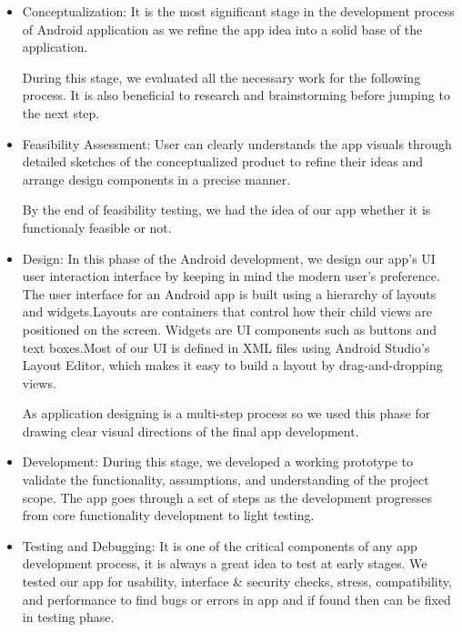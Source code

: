 \begin{itemize}

\item Conceptualization: It is the most significant stage in the development process of Android application as we refine the app idea into a solid base of the application. \par
During this stage, we evaluated all the necessary work for the following process. It is also beneficial to research and brainstorming before jumping to the next step. 

\item Feasibility Assessment: User can clearly understands the app visuals through detailed sketches of the conceptualized product to refine their ideas and arrange design components in a precise manner.\par
By the end of feasibility testing, we had the idea of our app whether it is functionaly feasible or not. 

\item Design: In this phase of the Android development, we design our app's UI user interaction interface by keeping in mind the modern user’s preference. The user interface for an Android app is built using a hierarchy of layouts and widgets.Layouts are containers that control how their child views are positioned on the screen. Widgets are UI components such as buttons and text boxes.Most of our UI is defined in XML files using Android Studio's Layout Editor, which makes it easy to build a layout by drag-and-dropping views.\par 
As application designing is a multi-step process so we used this phase for drawing clear visual directions of the final app development.

\item Development: During this stage, we developed a working prototype to validate the functionality, assumptions, and understanding of the project scope. The app goes through a set of steps as the development progresses from core functionality development to light testing.

\item Testing and Debugging: It is one of the critical components of any app development process, it is always a great idea to test at early stages. We tested our app for usability, interface & security checks, stress, compatibility, and performance to find bugs or errors in app and if found then can be fixed in testing phase. 
\end{itemize}




